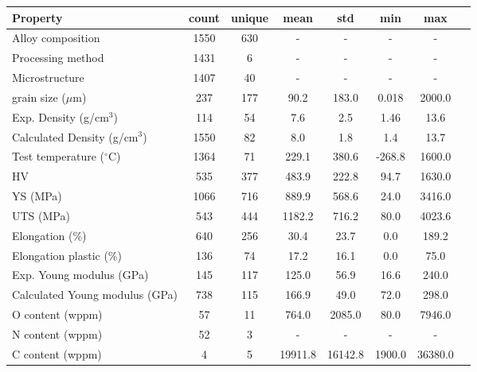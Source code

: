 \begin{tabular}{lccccccc}
\toprule
Property & count & unique & mean & std & min & max \\
\midrule
Alloy composition & 1550 & 630 & - & - & - & - \\
Processing method & 1431 & 6 & - & - & - & - \\
Microstructure & 1407 & 40 & - & - & - & - \\
grain size ($\mu$m) & 237 & 177 & 90.2 & 183.0 & 0.018 & 2000.0 \\
Exp. Density (g/cm$^3$) & 114 & 54 & 7.6 & 2.5 & 1.46 & 13.6 \\
Calculated Density (g/cm$^3$) & 1550 & 82 & 8.0 & 1.8 & 1.4 & 13.7 \\
Test temperature ($^\circ$C) & 1364 & 71 & 229.1 & 380.6 & -268.8 & 1600.0 \\
HV & 535 & 377 & 483.9 & 222.8 & 94.7 & 1630.0 \\
YS (MPa) & 1066 & 716 & 889.9 & 568.6 & 24.0 & 3416.0 \\
UTS (MPa) & 543 & 444 & 1182.2 & 716.2 & 80.0 & 4023.6 \\
Elongation (\%) & 640 & 256 & 30.4 & 23.7 & 0.0 & 189.2 \\
Elongation plastic (\%) & 136 & 74 & 17.2 & 16.1 & 0.0 & 75.0 \\
Exp. Young modulus (GPa) & 145 & 117 & 125.0 & 56.9 & 16.6 & 240.0 \\
Calculated Young modulus (GPa) & 738 & 115 & 166.9 & 49.0 & 72.0 & 298.0 \\
O content (wppm) & 57 & 11 & 764.0 & 2085.0 & 80.0 & 7946.0 \\
N content (wppm) & 52 & 3 & - & - & - & - \\
C content (wppm) & 4 & 5 & 19911.8 & 16142.8 & 1900.0 & 36380.0 \\
\bottomrule
\end{tabular}
